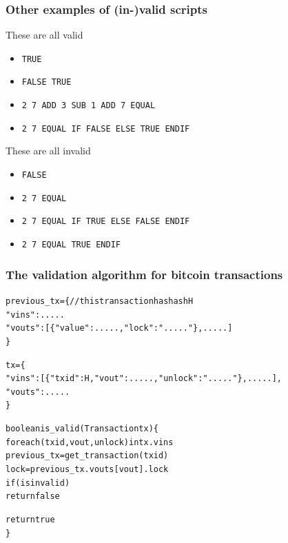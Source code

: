 \documentclass[11pt]{beamer}  %
\begin{document}
\begin{frame}\frametitle{Other examples of (in-)valid scripts}

  \begin{greenbox}{These are all valid}
    \begin{itemize}
    \item \texttt{TRUE}
    \item \texttt{FALSE TRUE}
    \item \texttt{2 7 ADD 3 SUB 1 ADD 7 EQUAL}
    \item \texttt{2 7 EQUAL IF FALSE ELSE TRUE ENDIF}
    \end{itemize}
  \end{greenbox}

  \bigskip

  \begin{greenbox}{These are all invalid}
    \begin{itemize}
    \item \texttt{FALSE}
    \item \texttt{2 7 EQUAL}
    \item \texttt{2 7 EQUAL IF TRUE ELSE FALSE ENDIF}
    \item \texttt{2 7 EQUAL TRUE ENDIF}
    \end{itemize}
  \end{greenbox}

\end{frame}

\begin{frame}[fragile]\frametitle{The validation algorithm for bitcoin transactions}

{\scriptsize\begin{alltt}
previous_tx = \{ // this transaction has hash H
  "vins": .....
  "vouts": [ \{ "value": .....,     "lock": "....." \}, ..... ]
\}

tx = \{
  "vins": [ \{ "txid": H,     "vout": .....,     "unlock": "....." \}, ..... ],
  "vouts": .....
\}
\end{alltt}}

    {\small\begin{alltt}
    boolean is_valid(Transaction tx) \{
      for each (txid, vout, unlock) in tx.vins
        previous_tx = \alert{get_transaction}(txid)
        lock = previous_tx.vouts[vout].lock
        if ({\color{blue}{unlock lock}} is invalid)
          return false

      return true
    \}
    \end{alltt}}

\end{frame}
\end{document}
